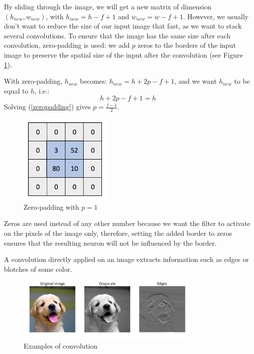 By sliding through the image, we will get a new matrix of dimension $(h_{new}, w_{new})$, with $h_{new}=h-f+1$ and $w_{new}=w-f+1$. However, we usually don't want to reduce the size of our input image that fast, as we want to stack several convolutions. To ensure that the image has the same size after each convolution, zero-padding is used: we add $p$ zeros to the borders of the input image to preserve the spatial size of the input after the convolution (see Figure \ref{fig:zeropadding}).

With zero-padding, $h_{new}$ becomes: $h_{new} =  h + 2p - f + 1$, and we want $h_{new}$ to be equal to $h$, i.e.:
\begin{equation}
    h + 2p - f + 1 = h
    \label{zeropadding}
\end{equation}
Solving (\ref{zeropadding}) gives $p=\frac{f-1}{2}$. 

\begin{figure}[H]
\centering
\includegraphics[width=0.4\textwidth]{Images/zeropadding.png}
\caption{Zero-padding with $p=1$}
\label{fig:zeropadding}
\end{figure}

Zeros are used instead of any other number because we want the filter to activate on the pixels of the image only, therefore, setting the added border to zeros ensures that the resulting neuron will not be influenced by the border.

A convolution directly applied on an image extracts information such as edges or blotches of some color.
\begin{figure}[H]
\centering
\includegraphics[width=0.8\textwidth]{Images/conv_ex.png}
\caption{Examples of convolution}
\label{fig:ex-conv}
\end{figure}


